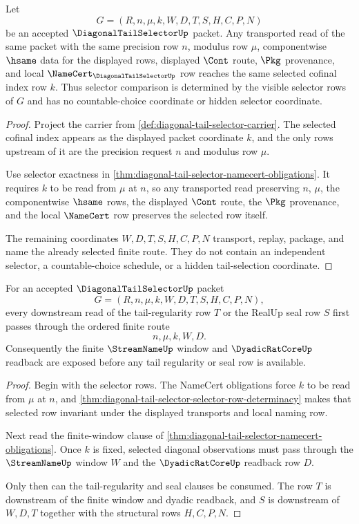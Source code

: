 \begin{theorem}
\label{thm:diagonal-tail-selector-selector-row-determinacy}
Let
$$
G=(R,n,\mu,k,W,D,T,S,H,C,P,N)
$$
be an accepted $\DiagonalTailSelectorUp$ packet. Any transported read of the
same packet with the same precision row $n$, modulus row $\mu$,
componentwise $\hsame$ data for the displayed rows, displayed $\Cont$ route,
$\Pkg$ provenance, and local $\NameCert_{\DiagonalTailSelectorUp}$ row reaches
the same selected cofinal index row $k$. Thus selector comparison is
determined by the visible selector rows of $G$ and has no countable-choice
coordinate or hidden selector coordinate.
\end{theorem}
\begin{proof}
Project the carrier from \autoref{def:diagonal-tail-selector-carrier}. The
selected cofinal index appears as the displayed packet coordinate $k$, and the
only rows upstream of it are the precision request $n$ and modulus row $\mu$.

Use selector exactness in
\autoref{thm:diagonal-tail-selector-namecert-obligations}. It requires $k$ to
be read from $\mu$ at $n$, so any transported read preserving $n$, $\mu$, the
componentwise $\hsame$ rows, the displayed $\Cont$ route, the $\Pkg$
provenance, and the local $\NameCert$ row preserves the selected row itself.

The remaining coordinates $W,D,T,S,H,C,P,N$ transport, replay, package, and
name the already selected finite route. They do not contain an independent
selector, a countable-choice schedule, or a hidden tail-selection coordinate.
\end{proof}

\begin{theorem}
\label{thm:diagonal-tail-selector-window-threshold-order}
For an accepted $\DiagonalTailSelectorUp$ packet
$$
G=(R,n,\mu,k,W,D,T,S,H,C,P,N),
$$
every downstream read of the tail-regularity row $T$ or the RealUp seal row
$S$ first passes through the ordered finite route
$$
n,\mu,k,W,D.
$$
Consequently the finite $\StreamNameUp$ window and $\DyadicRatCoreUp$ readback
are exposed before any tail regularity or seal row is available.
\end{theorem}
\begin{proof}
Begin with the selector rows. The NameCert obligations force $k$ to be read
from $\mu$ at $n$, and
\autoref{thm:diagonal-tail-selector-selector-row-determinacy} makes that
selected row invariant under the displayed transports and local naming row.

Next read the finite-window clause of
\autoref{thm:diagonal-tail-selector-namecert-obligations}. Once $k$ is fixed,
selected diagonal observations must pass through the $\StreamNameUp$ window
$W$ and the $\DyadicRatCoreUp$ readback row $D$.

Only then can the tail-regularity and seal clauses be consumed. The row $T$ is
downstream of the finite window and dyadic readback, and $S$ is downstream of
$W,D,T$ together with the structural rows $H,C,P,N$.
\end{proof}

